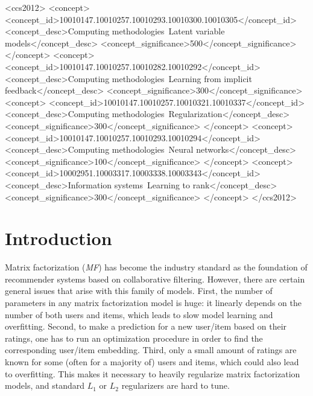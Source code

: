 \documentclass[sigconf,authorversion]{acmart}
\begin{document}
\begin{CCSXML}
<ccs2012>
<concept>
<concept_id>10010147.10010257.10010293.10010300.10010305</concept_id>
<concept_desc>Computing methodologies~Latent variable models</concept_desc>
<concept_significance>500</concept_significance>
</concept>
<concept>
<concept_id>10010147.10010257.10010282.10010292</concept_id>
<concept_desc>Computing methodologies~Learning from implicit feedback</concept_desc>
<concept_significance>300</concept_significance>
<concept>
<concept_id>10010147.10010257.10010321.10010337</concept_id>
<concept_desc>Computing methodologies~Regularization</concept_desc>
<concept_significance>300</concept_significance>
</concept>
<concept>
<concept_id>10010147.10010257.10010293.10010294</concept_id>
<concept_desc>Computing methodologies~Neural networks</concept_desc>
<concept_significance>100</concept_significance>
</concept>
<concept>
<concept_id>10002951.10003317.10003338.10003343</concept_id>
<concept_desc>Information systems~Learning to rank</concept_desc>
<concept_significance>300</concept_significance>
</concept>
</ccs2012>
\end{CCSXML}



\maketitle

\section{Introduction}

Matrix factorization (\emph{MF}) has become the industry standard as the foundation of recommender systems based on collaborative filtering. However, there are certain general issues that arise with this family of models. First, the number of parameters in any matrix factorization model is huge: it linearly depends on the number of both users and items, which leads to slow model learning and overfitting. Second, to make a prediction for a new user/item based on their ratings, one has to run an optimization procedure in order to find the corresponding user/item embedding. Third, only a small amount of ratings are known for some (often for a majority of) users and items, which could also lead to overfitting. This makes it necessary to heavily regularize matrix factorization models, and standard $L_1$ or $L_2$ regularizers are hard to tune.
\end{document}
